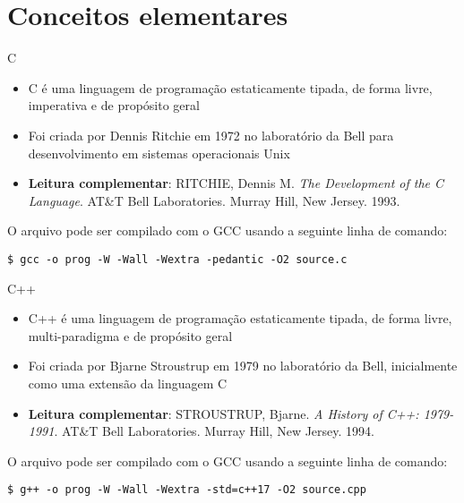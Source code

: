 \section{Conceitos elementares}

\begin{frame}[fragile]{C}

	\begin{itemize}
	
		\item C é uma linguagem de programação estaticamente tipada, de forma livre, imperativa e 
        de propósito geral

		\item Foi criada por Dennis Ritchie em 1972 no laboratório da Bell para desenvolvimento em 
        sistemas operacionais Unix

		\item {\bf Leitura complementar}: RITCHIE, Dennis M. {\it The Development of the C 
        Language}. AT\&T Bell Laboratories.  Murray Hill, New Jersey. 1993.

	\end{itemize}

    O arquivo  pode ser compilado com o GCC usando a seguinte linha de comando:

    \begin{center}
        \texttt{\$ gcc -o prog -W -Wall -Wextra -pedantic -O2 source.c}
    \end{center}

\end{frame}

\begin{frame}[fragile]{C++}

	\begin{itemize}
		\item C++ é uma linguagem de programação estaticamente tipada, de forma livre, 
        multi-paradigma e de propósito geral

        \item Foi criada por Bjarne Stroustrup em 1979 no laboratório da Bell, inicialmente como 
        uma extensão da linguagem C

		\item {\bf Leitura complementar}: STROUSTRUP, Bjarne.  {\it A History of C++: 1979-1991}. 
        AT\&T Bell Laboratories.  Murray Hill, New Jersey. 1994.
	\end{itemize}

    O arquivo  pode ser compilado com o GCC usando a seguinte linha de comando:

    \begin{center}
        \texttt{\$ g++ -o prog -W -Wall -Wextra -std=c++17 -O2 source.cpp}
    \end{center}
\end{frame}

